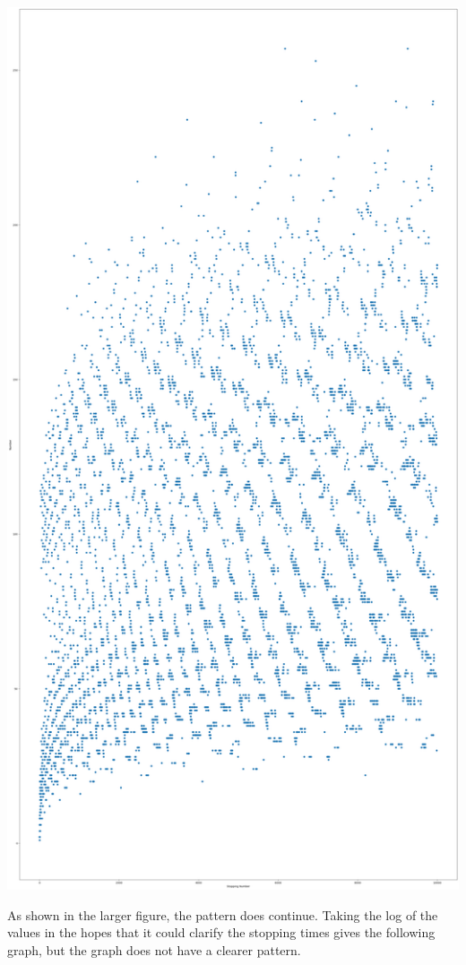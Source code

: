 \documentclass{article}
\theoremstyle{remark}
\theoremstyle{problem}
\numberwithin{problem}{subsection}
\numberwithin{Problem}{section}
\theoremstyle{definition}
\theoremstyle{definition}
\theoremstyle{definition}
\begin{document}
\begin{centering}
\includegraphics[height= 9 in]{images/10000 Collatz Stopping Times.png}
\end{centering}

As shown in the larger figure, the pattern does continue. Taking the log of the values in the hopes that it could clarify the stopping times gives the following graph, but the graph does not have a clearer pattern. 
\end{document}
